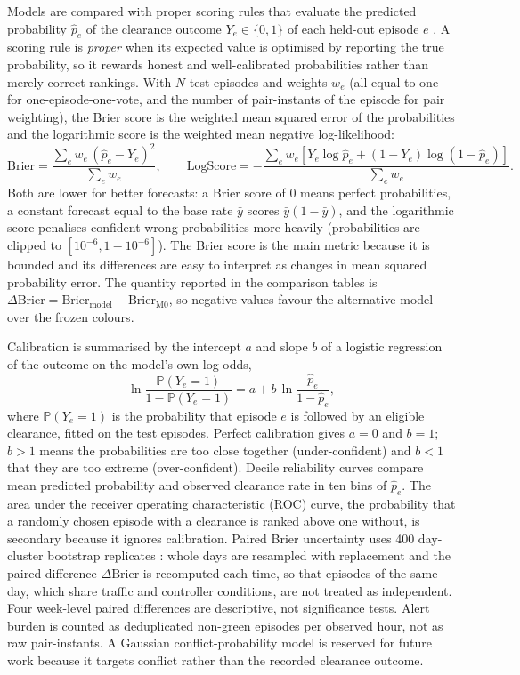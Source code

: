 \documentclass[aerospace,article,submit,moreauthors]{Definitions/mdpi}
\begin{document}
Models are compared with proper scoring rules that evaluate the predicted probability $\hat p_e$ of the clearance outcome $Y_e\in\{0,1\}$ of each held-out episode $e$ \cite{gneiting2007}. A scoring rule is \emph{proper} when its expected value is optimised by reporting the true probability, so it rewards honest and well-calibrated probabilities rather than merely correct rankings. With $N$ test episodes and weights $w_e$ (all equal to one for one-episode-one-vote, and the number of pair-instants of the episode for pair weighting), the Brier score is the weighted mean squared error of the probabilities and the logarithmic score is the weighted mean negative log-likelihood:
\begin{equation}\label{eq:brier}
 \mathrm{Brier}=\frac{\sum_e w_e\,(\hat p_e-Y_e)^2}{\sum_e w_e},\qquad
 \mathrm{LogScore}=-\frac{\sum_e w_e\left[Y_e\log\hat p_e+(1-Y_e)\log(1-\hat p_e)\right]}{\sum_e w_e}.
\end{equation}
Both are lower for better forecasts: a Brier score of 0 means perfect probabilities, a constant forecast equal to the base rate $\bar y$ scores $\bar y(1-\bar y)$, and the logarithmic score penalises confident wrong probabilities more heavily (probabilities are clipped to $[10^{-6},1-10^{-6}]$). The Brier score is the main metric because it is bounded and its differences are easy to interpret as changes in mean squared probability error. The quantity reported in the comparison tables is $\Delta\mathrm{Brier}=\mathrm{Brier}_{\text{model}}-\mathrm{Brier}_{\mathrm{M0}}$, so negative values favour the alternative model over the frozen colours.

Calibration is summarised by the intercept $a$ and slope $b$ of a logistic regression of the outcome on the model's own log-odds,
\begin{equation}\label{eq:calib}
 \ln\!\frac{\mathbb{P}(Y_e=1)}{1-\mathbb{P}(Y_e=1)}=a+b\,\ln\!\frac{\hat p_e}{1-\hat p_e},
\end{equation}
where $\mathbb{P}(Y_e=1)$ is the probability that episode $e$ is followed by an eligible clearance, fitted on the test episodes. Perfect calibration gives $a=0$ and $b=1$; $b>1$ means the probabilities are too close together (under-confident) and $b<1$ that they are too extreme (over-confident). Decile reliability curves compare mean predicted probability and observed clearance rate in ten bins of $\hat p_e$. The area under the receiver operating characteristic (ROC) curve, the probability that a randomly chosen episode with a clearance is ranked above one without, is secondary because it ignores calibration. Paired Brier uncertainty uses 400 day-cluster bootstrap replicates \cite{field2007}: whole days are resampled with replacement and the paired difference $\Delta\mathrm{Brier}$ is recomputed each time, so that episodes of the same day, which share traffic and controller conditions, are not treated as independent. Four week-level paired differences are descriptive, not significance tests. Alert burden is counted as deduplicated non-green episodes per observed hour, not as raw pair-instants. A Gaussian conflict-probability model is reserved for future work because it targets conflict rather than the recorded clearance outcome.
\end{document}
